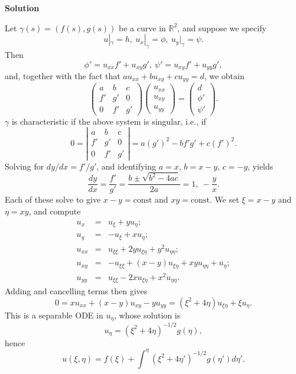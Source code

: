 \documentclass{article}
\begin{document}
\begin{enumerate}
{\bf Solution}

Let \(\gamma(s) = (f(s),g(s))\) be a curve in \(\mathbb{R}^2\), and suppose we specify
\[u|_{\gamma} = h, \ u_x|_{\gamma} = \phi, \ u_y|_{\gamma} = \psi.\]
Then
\[\phi' = u_{xx} f' + u_{xy} g', \ \psi' = u_{xy} f' + u_{yy} g',\]
and, together with the fact that \(a u_{xx} + b u_{xy} + c u_{yy} = d\), we obtain
\[\left( \begin{array}{ccc} a & b & c \\ f' & g' & 0 \\ 0 & f' & g' \end{array} \right) \left( \begin{array}{c} u_{xx} \\ u_{xy} \\ u_{yy} \end{array} \right) = \left( \begin{array}{c} d \\ \phi' \\ \psi' \end{array} \right).\]
\(\gamma\) is characteristic if the above system is singular, i.e., if
\[0 = \left| \begin{array}{ccc} a & b & c \\ f' & g' & 0 \\ 0 & f' & g' \end{array} \right| = a (g')^2 - b f' g' + c (f')^2.\]
Solving for \(dy/dx = f' / g'\), and identifying \(a = x\), \(b = x - y\), \(c = -y\), yields
\[\frac{dy}{dx} = \frac{f'}{g'} = \frac{b \pm \sqrt{b^2 - 4 a c}}{2 a} = 1, \ -\frac{y}{x}.\]
Each of these solve to give \(x - y = \text{const}\) and \(x y = \text{const}\).  We set \(\xi = x - y\) and \(\eta = x y\), and compute
\begin{eqnarray*}
u_x & = & u_{\xi} + y u_{\eta}; \\
u_y & = & -u_{\xi} + x u_{\eta}; \\
u_{xx} & = & u_{\xi\xi} + 2 y u_{\xi\eta} + y^2 u_{\eta\eta}; \\
u_{xy} & = & -u_{\xi\xi} + (x - y) u_{\xi\eta} + x y u_{\eta\eta} + u_{\eta}; \\
u_{yy} & = & u_{\xi\xi} - 2 x u_{\xi\eta} + x^2 u_{\eta\eta}.
\end{eqnarray*}
Adding and cancelling terms then gives
\[0 = x u_{xx} + (x - y) u_{xy} - y u_{yy} = (\xi^2 + 4 \eta) u_{\xi\eta} + \xi u_{\eta}.\]
This is a separable ODE in \(u_{\eta}\), whose solution is
\[u_{\eta} = (\xi^2 + 4 \eta)^{-1/2} g(\eta),\]
hence
\[u(\xi,\eta) = f(\xi) + \int^{\eta} (\xi^2 + 4 \eta')^{-1/2} g(\eta') d\eta'.\]




\end{enumerate}
\end{document}
